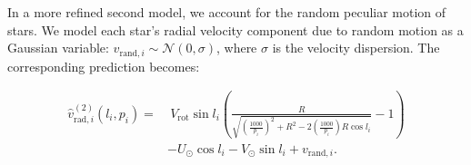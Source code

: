 In a more refined second model, we account for the random peculiar motion of stars. We model each star's radial velocity component due to random motion as a Gaussian variable: $v_{\text{rand},i} \sim \mathcal{N}(0, \sigma)$, where $\sigma$ is the velocity dispersion. The corresponding prediction becomes:

\begin{equation}\label{eq:VradModel2}
    \begin{aligned}
        \hat{v}_{\text{rad},i}^{(2)}(l_i, p_i) = &~V_{\text{rot}} \sin l_i \left( \frac{R}{\sqrt{\left(\frac{1000}{p_i}\right)^2 + R^2 - 2 \left(\frac{1000}{p_i}\right) R \cos l_i}} - 1 \right) \\
        &- U_{\odot} \cos l_i - V_{\odot} \sin l_i + v_{\text{rand},i}.
    \end{aligned}
\end{equation}
